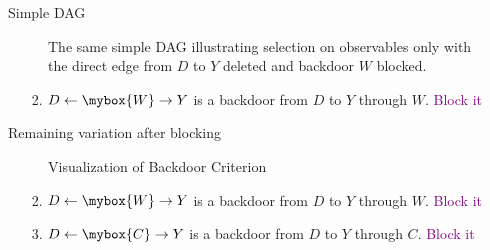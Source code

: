 \documentclass{beamer}
\begin{document}
\begin{frame}{Simple DAG}

\begin{figure}
\begin{center}
\caption{The same simple DAG illustrating selection on observables only with the direct edge from $D$ to $Y$ deleted and backdoor $W$ blocked.}
\end{center}
\end{figure}

\bigskip

\begin{enumerate}
\item[2. ] $D\leftarrow \mybox{W} \rightarrow Y$ is a backdoor from $D$ to $Y$ through $W$. \textcolor{purple}{Block it}
\end{enumerate}
\end{frame}



\begin{frame}{Remaining variation after blocking}

\begin{figure}
\begin{center}
\caption{Visualization of Backdoor Criterion}
\end{center}
\end{figure}

\bigskip

\begin{enumerate}
\item[2. ] $D\leftarrow \mybox{W} \rightarrow Y$ is a backdoor from $D$ to $Y$ through $W$. \textcolor{purple}{Block it}
\item[3. ] $D\leftarrow \mybox{C} \rightarrow Y$ is a backdoor from $D$ to $Y$ through $C$. \textcolor{purple}{Block it}
\end{enumerate}
\end{frame}
\end{document}
